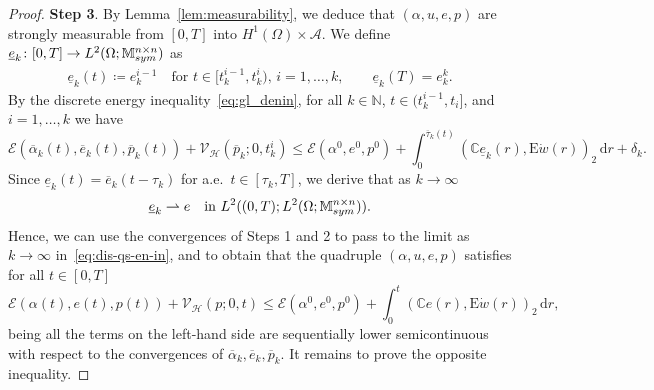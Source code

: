\documentclass[reqno]{amsart}
\theoremstyle{definition}
\numberwithin{equation}{section}
\def\de {\mathrm{d}}
\def\N {\mathbb N}
\def\M {\mathbb M^{n\times n}_{\rm sym}}
\def\C {\mathbb C}
\def\EE {\mathrm{E}}
\begin{document}
\begin{proof}
{\bf Step 3}. By Lemma~\ref{lem:measurability}, we deduce that $(\alpha,u,e,p)$ are strongly measurable from $[0,T]$ into $H^1(\Omega)\times\mathcal A$. We define $\underline e_k\colon [0,T]\to L^2(\Omega;\M)$ as 
\begin{align*}
\underline e_k(t)\coloneqq e_k^{i-1}\quad\text{for $t\in [t_k^{i-1},t_k^i)$, $i=1,\dots,k$},\qquad \underline e_k(T)=e_k^k.
\end{align*}
By the discrete energy inequality~\eqref{eq:gl_denin}, for all $k\in\N$, $t\in (t_k^{i-1},t_i]$, and $i=1,\dots,k$ we have
\begin{equation}\label{eq:dis-qs-en-in}
\mathcal E(\overline\alpha_k(t),\overline e_k(t),\overline p_k(t))+\mathcal V_{\mathcal H}(\overline p_k;0,t_k^i)\le \mathcal E(\alpha^0,e^0,p^0)+\int_0^{\overline\tau_k(t)}(\C \underline e_k(r),\EE \dot w(r))_2\,\de r+\delta_k.
\end{equation}
Since $\underline e_k(t)=\overline e_k(t-\tau_k)$ for a.e.\ $t\in [\tau_k,T]$, we derive that as $k\to\infty$
$$\underline e_k \rightharpoonup e\quad\text{in $L^2((0,T);L^2(\Omega;\M))$}.$$
Hence, we can use the convergences of Steps 1 and 2 to pass to the limit as $k\to\infty$ in~\eqref{eq:dis-qs-en-in}, and to obtain that the quadruple $(\alpha,u,e,p)$ satisfies for all $t\in[0,T]$
$$\mathcal E(\alpha(t),e(t),p(t))+\mathcal V_{\mathcal H}(p;0,t)\le \mathcal E(\alpha^0,e^0,p^0)+\int_0^t(\C e(r),\EE \dot w(r))_2\,\de r,$$
being all the terms on the left-hand side are sequentially lower semicontinuous with respect to the convergences of $\overline \alpha_k,\overline e_k,\overline p_k$. It remains to prove the opposite inequality.


\end{proof}
\end{document}
